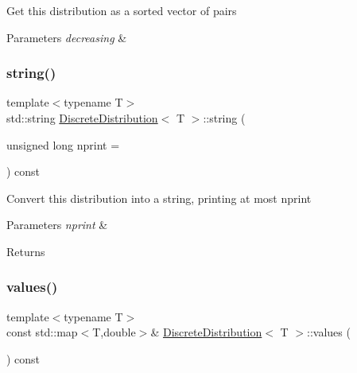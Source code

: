 Get this distribution as a sorted vector of pairs 
\begin{DoxyParams}{Parameters}
{\em decreasing} & \\
\hline
\end{DoxyParams}
\mbox{\label{class_discrete_distribution_a87d866919f4698e488aee9ce4bc42ed5}} 
\subsubsection{\texorpdfstring{string()}{string()}}
{\footnotesize\ttfamily template$<$typename T$>$ \\
std\+::string \hyperlink{class_discrete_distribution}{Discrete\+Distribution}$<$ T $>$\+::string (\begin{DoxyParamCaption}\item[{unsigned long}]{nprint = {} }\end{DoxyParamCaption}) const\hspace{0.3cm}{\ttfamily [inline]}}

Convert this distribution into a string, printing at most nprint 
\begin{DoxyParams}{Parameters}
{\em nprint} & \\
\hline
\end{DoxyParams}
\begin{DoxyReturn}{Returns}

\end{DoxyReturn}
\mbox{\label{class_discrete_distribution_a995377a760a6fe0d44077892053acdbb}} 
\subsubsection{\texorpdfstring{values()}{values()}}
{\footnotesize\ttfamily template$<$typename T$>$ \\
const std\+::map$<$T,double$>$\& \hyperlink{class_discrete_distribution}{Discrete\+Distribution}$<$ T $>$\+::values (\begin{DoxyParamCaption}{ }\end{DoxyParamCaption}) const\hspace{0.3cm}{\ttfamily [inline]}}

